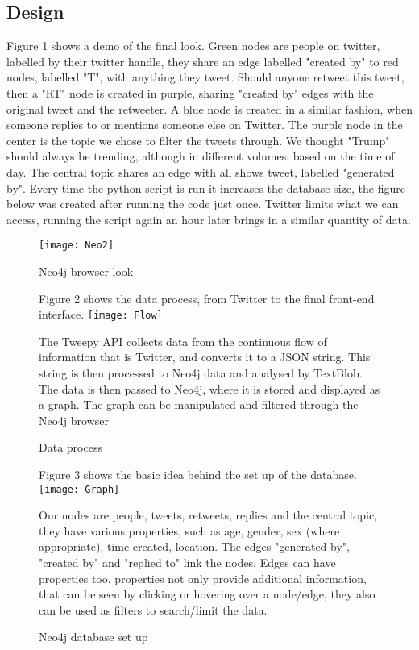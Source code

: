 \documentclass[11pt]{article}
\begin{document}
\subsection{Design}
Figure 1 shows a demo of the final look.\newline
 Green nodes are people on twitter, labelled by their twitter handle, they share an edge labelled "created by" to red nodes, labelled "T", with anything they tweet. Should anyone retweet this tweet, then a "RT" node is created in purple, sharing "created by" edges with the original tweet and the retweeter. A blue node is created in a similar fashion, when someone replies to or mentions someone else on Twitter.\newline
 The purple node in the center is the topic we chose to filter the tweets through. We thought "Trump" should always be trending, although in different volumes, based on the time of day. The central topic shares an edge with all shows tweet, labelled "generated by". \newline
Every time the python script is run it increases the database size, the figure below was created after running the code just once. Twitter limits what we can access, running the script again an hour later brings in a similar quantity of data. 
\begin{figure}
\texttt{[image: Neo2]}
\caption{Neo4j browser look} 
\label{fig: 1}
\end{figure}

\begin{figure}
Figure 2 shows the data process, from Twitter to the final front-end interface.\newline
\newline
\texttt{[image: Flow]}\newline
\caption{Data process} 
\label{fig: 2}
The Tweepy API collects data from the continuous flow of information that is Twitter, and converts it to a JSON string. This string is then processed to Neo4j data and analysed by TextBlob. The data is then passed to Neo4j, where it is stored and displayed as a graph. The graph can be manipulated and filtered through the Neo4j browser
\end{figure}

\begin{figure}
Figure 3 shows the basic idea behind the set up of the database.\newline
\texttt{[image: Graph]}\newline
\caption{Neo4j database set up} 
\label{fig: 3}
Our nodes are people, tweets, retweets, replies and the central topic, they have various properties, such as age, gender, sex (where appropriate), time created, location.
The edges "generated by", "created by" and "replied to" link the nodes. Edges can have properties too, properties not only provide additional information, that can be seen by clicking or hovering over a node/edge, they also can be used as filters to search/limit the data.
\end{figure}
\end{document}
